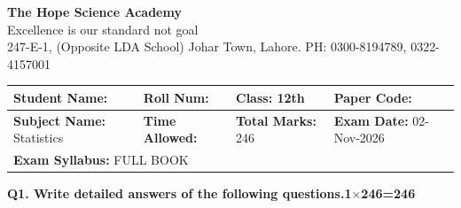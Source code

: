 \documentclass[11pt,a4paper]{article}
\begin{document}
\begin{center}
  {\Huge\bfseries The Hope Science Academy}\\[3pt]
  {\small Excellence is our standard not goal}\\[2pt]
  {\small 247-E-1, (Opposite LDA School) Johar Town, Lahore. PH: 0300-8194789, 0322-4157001}
\end{center}
\medskip\noindent
\begin{tabularx}{\linewidth}{|X|X|X|X|}
\hline
\textbf{Student Name:} & \textbf{Roll Num:} & \textbf{Class:} 12th & \textbf{Paper Code:} \\ \hline
\textbf{Subject Name:} Statistics & \textbf{Time Allowed:} & \textbf{Total Marks:} 246 & \textbf{Exam Date:} 02-Nov-2026 \\ \hline
\multicolumn{4}{|l|}{\textbf{Exam Syllabus:} FULL BOOK} \\ \hline
\end{tabularx}
\bigskip
\noindent\textbf{Q1. Write detailed answers of the following questions.}\hfill\textbf{1$\times$246=246}
\end{document}
